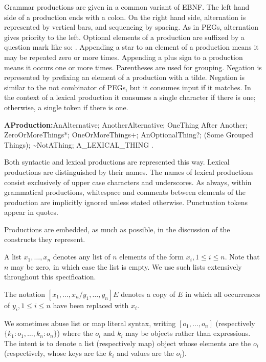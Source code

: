 \documentclass{article}
\begin{document}
\LMHash{}
Grammar productions are given in a common variant of EBNF.
The left hand side of a production ends with a colon.
On the right hand side, alternation is represented by vertical bars, and sequencing by spacing.
As in PEGs, alternation gives priority to the left.
Optional elements of a production are suffixed by a question mark like so: .
Appending a star to an element of a production means it may be repeated zero or more times.
Appending a plus sign to a production means it occurs one or more times.
Parentheses are used for grouping.
Negation is represented by prefixing an element of a production with a tilde.
Negation is similar to the not combinator of PEGs, but it consumes input if it matches.
In the context of a lexical production it consumes a single character if there is one; otherwise, a single token if there is one.


\begin{grammar}
{\sf
{\bf AProduction:}AnAlternative;
  AnotherAlternative;
  OneThing After Another;
  ZeroOrMoreThings*;
  OneOrMoreThings+;
  AnOptionalThing?;
  (Some Grouped Things);
  \~{}NotAThing;
  A\_LEXICAL\_THING
  .
}
\end{grammar}

\LMHash{}
Both syntactic and lexical productions are represented this way.
Lexical productions are distinguished by their names.
The names of lexical productions consist exclusively of upper case characters and underscores.
As always, within grammatical productions, whitespace and comments between elements of the production are implicitly ignored unless stated otherwise.
Punctuation tokens appear in quotes.

\LMHash{}
Productions are embedded, as much as possible, in the discussion of the constructs they represent.

\LMHash{}
A list $x_1, \ldots, x_n$ denotes any list of $n$ elements of the form $x_i, 1 \le i \le n$.
Note that $n$ may be zero, in which case the list is empty.
We use such lists extensively throughout this specification.

\LMHash{}
The notation $[x_1, \ldots, x_n/y_1, \ldots, y_n]E$ denotes a copy of $E$ in which all occurrences of $y_i, 1 \le i \le n$ have been replaced with $x_i$.

\LMHash{}
We sometimes abuse list or map literal syntax, writing $[o_1, \ldots, o_n]$ (respectively $\{k_1: o_1, \ldots, k_n: o_n\}$) where the $o_i$ and $k_i$ may be objects rather than expressions.
The intent is to denote a list (respectively map) object whose elements are the $o_i$ (respectively, whose keys are the $k_i$ and values are the $o_i$).
\end{document}
